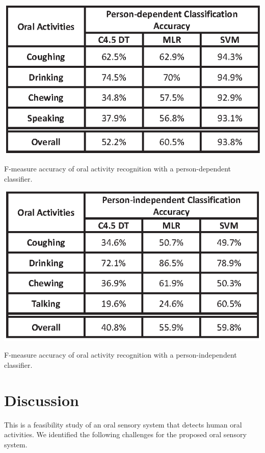 \begin{table}[!ht]
\centering
\includegraphics[width=14cm]{image/teeth_table2}
\caption{F-measure accuracy of oral activity recognition with a person-dependent classifier.}
\label{teeth_pdc}
\end{table}

\begin{table}[!ht]
\centering
\includegraphics[width=14cm]{image/teeth_table3}
\caption{F-measure accuracy of oral activity recognition with a person-independent classifier.}
\label{teeth_pidc}
\end{table}

\newpage
\section{Discussion}
This is a feasibility study of an oral sensory system that detects human oral activities. We identified the following challenges for the proposed oral sensory system.

